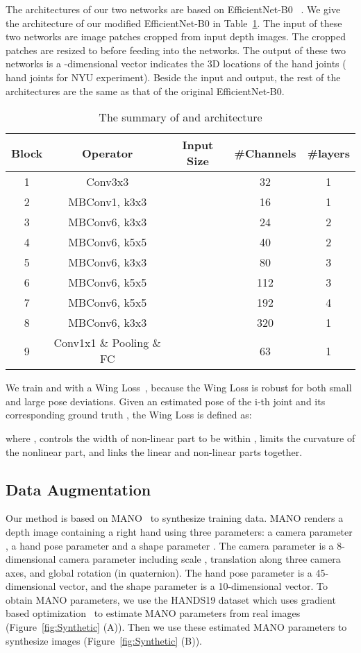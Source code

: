 \documentclass{article}
\begin{document}
The architectures of our two networks are based on EfficientNet-B0 ~\cite{tan2019efficientnet}. We give the architecture of our modified EfficientNet-B0 in Table~\ref{tab:effcientnet_b0}. The input of these two networks are image patches cropped from input depth images. The cropped patches are resized to  before feeding into the networks. The output of these two networks is a -dimensional vector indicates the 3D locations of the  hand joints ( hand joints for NYU experiment). Beside the input and output, the rest of the architectures are the same as that of the original EfficientNet-B0.
\begin{table} \scriptsize
\centering
\begin{tabular}{c|c|c|c|c}
\hline
Block & Operator &  Input Size     &  \#Channels & \#layers  \\ \hline
\hline
1 & Conv3x3 &       &  32 & 1  \\ \hline
2 & MBConv1, k3x3 &       &  16 & 1  \\ \hline
3 & MBConv6, k3x3 &       &  24 & 2  \\ \hline
4 & MBConv6, k5x5 &       &  40 & 2  \\ \hline
5 & MBConv6, k3x3 &       &  80 & 3  \\ \hline
6 & MBConv6, k5x5 &       &  112 & 3  \\ \hline
7 & MBConv6, k5x5 &       &  192 & 4  \\ \hline
8 & MBConv6, k3x3 &       &  320 & 1  \\ \hline
9 & Conv1x1 \& Pooling \& FC &       &  63 & 1  \\ 
\hline
\end{tabular}	\caption{\label{tab:effcientnet_b0} The summary of  and  architecture}
\end{table}

We train  and  with a Wing Loss~\cite{feng2018wing}, because the Wing Loss is robust for both small and large pose deviations. Given an estimated pose  of the i-th joint and its corresponding ground truth , the Wing Loss is defined as:

where ,  controls the width of non-linear part to be within ,  limits the curvature of the nonlinear part, and  links the linear and non-linear parts together.


\subsection{Data Augmentation}\label{sec:augment}
Our method is based on MANO~\cite{romero2017embodied} to synthesize training data. MANO renders a depth image containing a right hand using three parameters: a camera parameter , a hand pose parameter  and a shape parameter . The camera parameter  is a 8-dimensional camera parameter including scale , translation  along three camera axes, and global rotation  (in quaternion). The hand pose parameter  is a 45-dimensional vector, and the shape parameter  is a 10-dimensional vector.
To obtain MANO parameters, we use the HANDS19 dataset which uses gradient based optimization~\cite{baek2019pushing} to estimate MANO parameters from real images (Figure~\ref{fig:Synthetic} (A)). Then we use these estimated MANO parameters to synthesize images (Figure~\ref{fig:Synthetic} (B)). 
\end{document}
